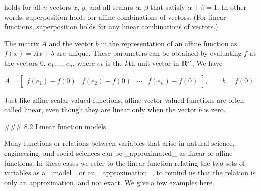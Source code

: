 holds for all \(n\)-vectors \(x\), \(y\), and all scalars \(\alpha\), \(\beta\) that satisfy \(\alpha+\beta=1\). In other words, superposition holds for affine combinations of vectors. (For linear functions, superposition holds for any linear combinations of vectors.)

The matrix \(A\) and the vector \(b\) in the representation of an affine function as \(f(x)=Ax+b\) are unique. These parameters can be obtained by evaluating \(f\) at the vectors \(0\), \(e_{1},\ldots,e_{n}\), where \(e_{k}\) is the \(k\)th unit vector in \({\bf R}^{n}\). We have

\[A=\left[\begin{array}{cccc}f(e_{1})-f(0)&f(e_{2})-f(0)&\cdots&f(e_{n})-f(0) \end{array}\right],\qquad b=f(0).\]

Just like affine scalar-valued functions, affine vector-valued functions are often called linear, even though they are linear only when the vector \(b\) is zero.

### 8.2 Linear function models

Many functions or relations between variables that arise in natural science, engineering, and social sciences can be _approximated_ as linear or affine functions. In these cases we refer to the linear function relating the two sets of variables as a _model_ or an _approximation_, to remind us that the relation is only an approximation, and not exact. We give a few examples here.

